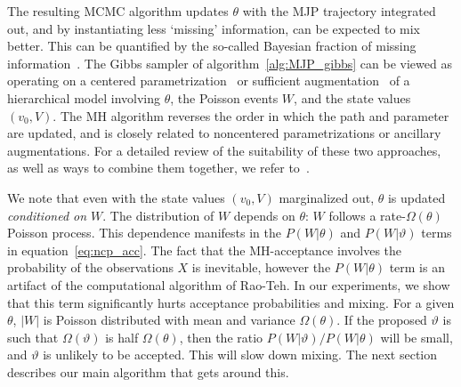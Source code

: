 \vspace{-.1in}
The resulting MCMC algorithm updates $\theta$ with the MJP trajectory 
integrated out, and by instantiating less `missing' information, can be expected to mix better. 
This can be quantified by the so-called Bayesian fraction of missing information~\citep{liu1994fraction, papaspiliopoulos2007general}. 
The Gibbs sampler of algorithm~\ref{alg:MJP_gibbs} can be viewed as operating on a centered parametrization~\citep{papaspiliopoulos2007general} or sufficient augmentation~\citep{yu2011center} of a hierarchical model involving $\theta$, the Poisson events $W$, and the state values $(v_0,V)$. The MH algorithm reverses the order in which the path and parameter are updated, and is closely related to noncentered parametrizations or ancillary augmentations. 
For a detailed review of the suitability of these two approaches, as well as ways to combine them together, we refer to~\citet{papaspiliopoulos2007general, yu2011center}.

We note that even with the state values $(v_0,V)$ marginalized out, $\theta$ is updated {\em conditioned on $W$}. 
The distribution of $W$ depends on $\theta$: $W$ follows a rate-$\Omega(\theta)$ Poisson process. This dependence manifests in the $P(W|\theta)$ and $P(W|\vartheta)$ terms in equation~\eqref{eq:ncp_acc}. 
The fact that the MH-acceptance involves the probability of the observations  $X$ is inevitable, however the $P(W|\theta)$ term is an artifact of the computational algorithm of Rao-Teh. 
In our experiments, we show that this term significantly hurts acceptance probabilities and mixing. 
For a given $\theta$, $|W|$ is Poisson distributed with mean and variance $\Omega(\theta)$. 
If the proposed $\vartheta$ is such that $\Omega(\vartheta)$ is half $\Omega(\theta)$, then the ratio $P(W|\vartheta)/P(W|\theta)$ will be small, and $\vartheta$ is unlikely to be accepted. 
This will slow down mixing.
The next section describes our main algorithm that gets around this.
